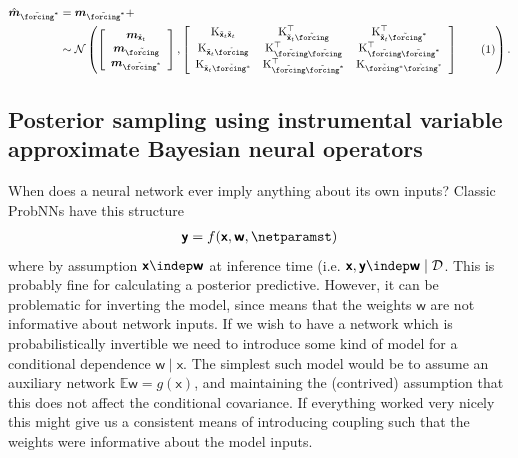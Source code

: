 \documentclass{article}
\newcommand\numberthis{\addtocounter{equation}{1}\tag{\theequation}}
\newcommand{\vv}[1]{\boldsymbol{#1}}
\newcommand{\mm}[1]{\mathrm{#1}}
\newcommand{\rv}[1]{\mathsf{#1}}
\newcommand{\vrv}[1]{\vv{\rv{#1}}}
\newcommand{\dist}[1]{\mathcal{#1}}
\newcommand{\gvn}{\mid}
\newcommand{\Ex}{\mathbb{E}}
\newcommand{\state}{\rv{x}}
\begin{document}
\begin{align*}
\hat{\vv{m}}_{\tilde{\forcing}^{*}}
&=\vv{m}_{\tilde{\forcing}^{*}} + \\
&\sim\dist{N}\left(
    \left[\begin{array}{c}
        \vv{m}_{\tilde{\vv{\state}}_{t}}\\
        \vv{m}_{\tilde{\forcing}}\\
        \vv{m}_{\tilde{\forcing}^{*}}
    \end{array}\right],
    \left[\begin{array}{ccc}
        \mm{K}_{\tilde{\vv{\state}}_{t}\tilde{\vv{\state}}_{t}}
        & \mm{K}_{\tilde{\vv{\state}}_{t}\tilde{\forcing}}^{\top}
        & \mm{K}_{\tilde{\vv{\state}}_{t}\tilde{\forcing}^{*}}^{\top} \\
          \mm{K}_{\tilde{\vv{\state}}_{t}\tilde{\forcing}}
        & \mm{K}_{\tilde{\forcing}\tilde{\forcing}}^{\top}
        & \mm{K}_{\tilde{\forcing}\tilde{\forcing}^{*}}^{\top} \\
          \mm{K}_{\tilde{\vv{\state}}_{t}\tilde{\forcing^{*}}}
        & \mm{K}_{\tilde{\forcing}\tilde{\forcing}^{*}}^{\top}
        & \mm{K}_{\tilde{\forcing^{*}}\tilde{\forcing}^{*}} \\
    \end{array}\right]\numberthis\label{eq:discrete_joint_naive_sub}
\right).
\end{align*}

\subsection{Posterior sampling using instrumental variable approximate Bayesian neural operators}

When does a neural network ever imply anything about its own inputs?
Classic ProbNNs have this structure
\begin{align*}
    \vrv{y}=f(\vrv{x}, \vrv{w}, \netparamst)
\end{align*}
where by assumption \(\vrv{x} \indep \vrv{w}\) at inference time (i.e.
\(\vrv{x},\vrv{y} \indep \vrv{w}\gvn\mathcal{D}\).
This is probably fine for calculating a posterior predictive.
However, it can be problematic for inverting the model, since means that the weights \(\vrv{w}\) are not informative about network inputs.
If we wish to have a network which is probabilistically invertible we need to introduce some kind of model for a conditional dependence \(\vrv{w}\gvn\vrv{x}\).
The simplest such model would be to assume an auxiliary network \(\Ex\vrv{w}=g(\vrv{x})\), and maintaining the (contrived) assumption that this does not affect the conditional covariance.
If everything worked very nicely this might give us a consistent means of introducing coupling such that the weights were informative about the model inputs.
\end{document}
